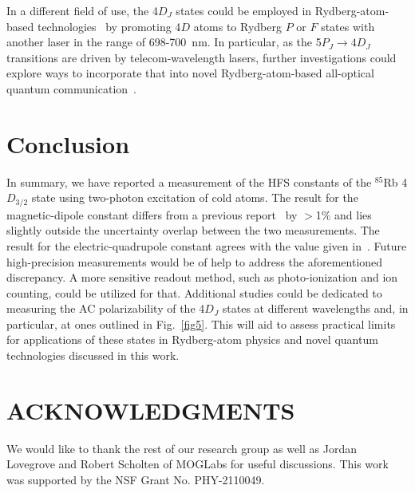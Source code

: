 \documentclass[reprint, amsmath,amssymb, aps, pra, longbibliography]{revtex4-1}
\begin{document}
In a different field of use, the 4$D_J$ states could be employed in Rydberg-atom-based technologies~\cite{Adams_2019} by promoting 4$D$ atoms to Rydberg $P$ or $F$ states with another laser in the range of 698-700~nm. In particular, as the 5$P_J \rightarrow 4D_J$ transitions are driven by telecom-wavelength lasers, further investigations could explore ways to incorporate that into novel Rydberg-atom-based all-optical quantum communication~\cite{Kimble2008}.

\section{Conclusion}
\label{sec:concl}
In summary, we have reported a measurement of the HFS constants of the $^{85}$Rb 4$D_{3/2}$ state using two-photon excitation of cold atoms. The result for the magnetic-dipole constant differs from a previous report~\cite{moon2009} by $>$1\% and lies slightly 
outside the uncertainty overlap between the two measurements. The result for the electric-quadrupole constant agrees with the value given in~\cite{moon2009}. Future high-precision measurements would be of help to address the aforementioned discrepancy. A more sensitive readout method, such as photo-ionization and ion counting, could be utilized for that. Additional studies could be dedicated to measuring the AC polarizability of the 4$D_J$ states at different wavelengths and, in particular, at ones outlined in Fig.~\ref{fig5}. This will aid to assess practical limits for applications of these states in Rydberg-atom physics and novel quantum technologies discussed in this work.


\maketitle
\section*{ACKNOWLEDGMENTS}
We would like to thank the rest of our research group as well as Jordan Lovegrove and Robert Scholten of MOGLabs for useful discussions. This work was supported by the NSF Grant No. PHY-2110049.


\end{document}
